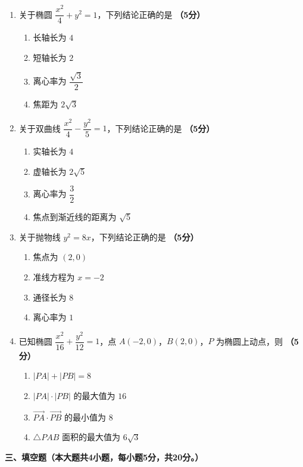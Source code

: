 \documentclass[12pt, a4paper]{ctexart}
\newcommand{\score}[1]{\hfill\textbf{（#1分）}}
\begin{document}
\begin{enumerate}[resume]
\item 关于椭圆 $\dfrac{x^2}{4}+y^2=1$，下列结论正确的是 \score{5}
\begin{enumerate}[label=\Alph*.]
\item 长轴长为 $4$
\item 短轴长为 $2$
\item 离心率为 $\dfrac{\sqrt{3}}{2}$
\item 焦距为 $2\sqrt{3}$
\end{enumerate}

\item 关于双曲线 $\dfrac{x^2}{4}-\dfrac{y^2}{5}=1$，下列结论正确的是 \score{5}
\begin{enumerate}[label=\Alph*.]
\item 实轴长为 $4$
\item 虚轴长为 $2\sqrt{5}$
\item 离心率为 $\dfrac{3}{2}$
\item 焦点到渐近线的距离为 $\sqrt{5}$
\end{enumerate}

\item 关于抛物线 $y^2=8x$，下列结论正确的是 \score{5}
\begin{enumerate}[label=\Alph*.]
\item 焦点为 $(2,0)$
\item 准线方程为 $x=-2$
\item 通径长为 $8$
\item 离心率为 $1$
\end{enumerate}

\item 已知椭圆 $\dfrac{x^2}{16}+\dfrac{y^2}{12}=1$，点 $A(-2,0)$，$B(2,0)$，$P$ 为椭圆上动点，则 \score{5}
\begin{enumerate}[label=\Alph*.]
\item $|PA|+|PB|=8$
\item $|PA|\cdot|PB|$ 的最大值为 $16$
\item $\overrightarrow{PA}\cdot\overrightarrow{PB}$ 的最小值为 $8$
\item $\triangle PAB$ 面积的最大值为 $6\sqrt{3}$
\end{enumerate}
\end{enumerate}

\vspace{1em}

\noindent\textbf{三、填空题（本大题共4小题，每小题5分，共20分。）}

\vspace{0.5em}
\end{document}
